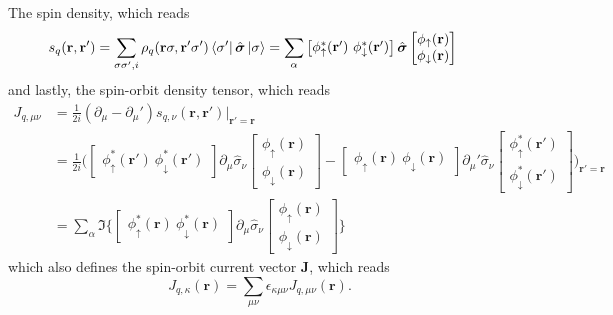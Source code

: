 The spin density, which reads
\begin{align}
    s_q(\mathbf r, \mathbf r') &=\sum_{\sigma \sigma', i} \rho_q(\mathbf r \sigma, \mathbf r' \sigma')\bra{\sigma'} \hat {\boldsymbol{\sigma}} \ket{\sigma} = \sum_{\alpha} \begin{bmatrix} \phi_{\uparrow}^*(\mathbf r') \ \phi_{\downarrow}^*(\mathbf r') \end{bmatrix}\hat{\boldsymbol{\sigma}} \begin{bmatrix} \phi_{\uparrow}(\mathbf r) \\ \phi_{\downarrow}(\mathbf r) \end{bmatrix}
\end{align}
and lastly, the spin-orbit density tensor, which reads
\begin{align}
    J_{q, \mu\nu} &= \frac 1 {2i}(\partial_\mu - \partial_\mu') s_{q, \nu}(\mathbf r, \mathbf r')\bigg|_{\mathbf r'=\mathbf r}\nonumber \\
    &= \frac 1 {2i}\bigg(\begin{bmatrix}\phi_{\uparrow}^*(\boldsymbol r')\ \phi_{\downarrow}^*(\boldsymbol r')\end{bmatrix} \partial_\mu\hat{\sigma}_\nu\begin{bmatrix} \phi_{\uparrow}(\mathbf r) \\ \phi_{\downarrow}(\mathbf r) \end{bmatrix} - \begin{bmatrix}\phi_{\uparrow}(\boldsymbol{r})\ \phi_{\downarrow}(\boldsymbol{r})\end{bmatrix} \partial_\mu'\hat{\sigma}_\nu\begin{bmatrix} \phi_{\uparrow}^*(\mathbf r') \\ \phi_{\downarrow}^*(\mathbf r') \end{bmatrix}\bigg)_{\mathbf r'=\mathbf r}\nonumber
     \\&= \sum_\alpha\Im\bigg\{\begin{bmatrix}\phi_{\uparrow}^*(\boldsymbol r)\ \phi_{\downarrow}^*(\boldsymbol r) \end{bmatrix}\partial_\mu \hat{\sigma}_\nu\begin{bmatrix} \phi_{\uparrow}(\mathbf r) \\ \phi_{\downarrow}(\mathbf r) \end{bmatrix}\bigg\}
\end{align}
which also defines the spin-orbit current vector $\bm J$, which reads
\begin{equation}
     J_{q,\kappa} (\bm r ) = \sum_{\mu\nu}\epsilon_{\kappa\mu\nu} J_{q, \mu\nu}(\bm r).
\end{equation}
